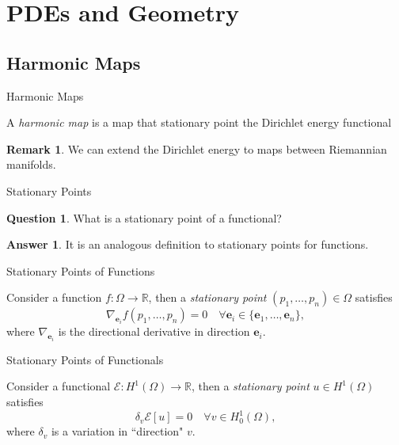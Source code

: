 \documentclass[usenames,dvipsnames]{beamer}
\theoremstyle{definition}
\newtheorem*{remark}{Remark}
\newtheorem*{question}{Question}
\newtheorem*{answer}{Answer}
\theoremstyle{theorem}
\newcommand{\R}{\mathbb{R}}
\begin{document}
        
      
        
    
\section{PDEs and Geometry}

\subsection{Harmonic Maps}

\begin{frame}{Harmonic Maps}
    \begin{definition}
    A \emph{harmonic map} is a map that stationary point the Dirichlet energy functional
    \end{definition}
    
    \begin{remark}
    We can extend the Dirichlet energy to maps between Riemannian manifolds.
    \end{remark}
\end{frame}

\begin{frame}{Stationary Points}
    \begin{question}
        What is a stationary point of a functional?
    \end{question}
    \pause
    \begin{answer}
        It is an analogous definition to stationary points for functions.
    \end{answer}
\end{frame}

\begin{frame}{Stationary Points of Functions}
\begin{definition}
    Consider a function $f\colon \Omega \to \R$, then a \emph{stationary point} $(p_1,\dots,p_n)\in \Omega$ satisfies
    \[
    \nabla_{\mathbf{e}_i} f(p_1,\dots,p_n) = 0 \quad \forall \mathbf{e}_i \in \{\mathbf{e}_1,\dots,\mathbf{e}_n\},
    \]
    where $\nabla_{\mathbf{e}_i}$ is the directional derivative in direction $\mathbf{e}_i$.
    \end{definition}
\end{frame}

\begin{frame}{Stationary Points of Functionals}
\begin{definition}
    Consider a functional $\mathcal{E}\colon H^1(\Omega) \to \R$, then a \emph{stationary point} $u\in H^1(\Omega)$ satisfies
    \[
    \delta_v \mathcal{E}[u]=0\quad \forall v \in H^1_0(\Omega),
    \]
    where $\delta_v$ is a variation in ``direction" $v$.
    \end{definition}
\end{frame}
\end{document}

